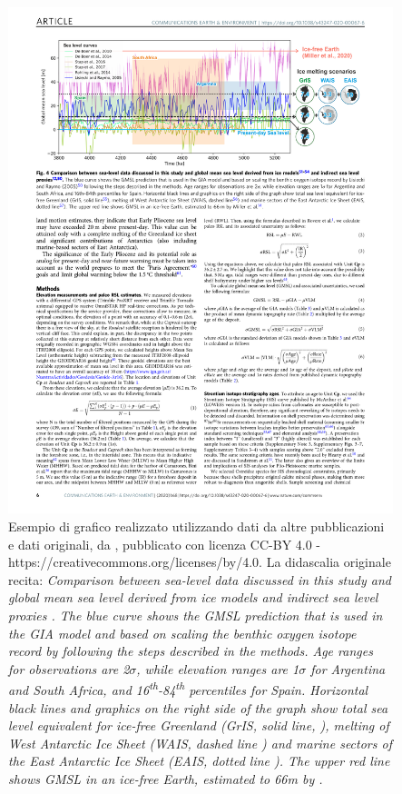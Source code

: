 \documentclass[9pt,a4paper,twoside]{rho-class/rho}
\begin{document}
\begin{figure}[h!]
    \centering
    \includegraphics[width=0.9\linewidth]{figures/composite_image.pdf}
    \caption{Esempio di grafico realizzato utilizzando dati da altre pubblicazioni e dati originali, da \cite{rovere_higher_2020}, pubblicato con licenza CC-BY 4.0 - https://creativecommons.org/licenses/by/4.0. La didascalia originale recita: 
    \textit{Comparison between sea-level data discussed in this study and global mean sea level derived from ice models \parencite{deBoer2010,deBoer2014,stap2016,stap2017} and indirect sea level proxies \parencite{rohling2014sea,lisiecki2005pliocene}. The blue curve shows the GMSL prediction that is used in the GIA model and based on scaling the benthic oxygen isotope record by \cite{lisiecki2005pliocene} following the steps described in the methods. Age ranges for observations are 2$\sigma$, while elevation ranges are 1$\sigma$ for Argentina and South Africa, and 16\textsuperscript{th}-84\textsuperscript{th} percentiles for Spain. Horizontal black lines and graphics on the right side of the graph show total sea level equivalent for ice-free Greenland (GrIS, solid line, \cite{morlighem2017bedmachine}), melting of West Antarctic Ice Sheet (WAIS, dashed line \cite{bamber2009reassessment})  and marine sectors of the East Antarctic Ice Sheet (EAIS, dotted line \cite{fretwell2013bedmap2}). The upper red line shows GMSL in an ice-free Earth, estimated to 66m by \cite{Miller1346}.}}
    \label{fig:citations_figure}
\end{figure}
\end{document}
